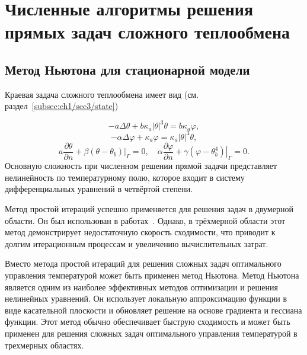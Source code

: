 \section{Численные алгоритмы решения прямых задач сложного теплообмена}
\label{sec:ch4/sec1}

\subsection{Метод Ньютона для стационарной модели}
\label{subsec:ch4/sec1/stationary}
Краевая задача сложного теплообмена
имеет вид (см. раздел~\ref{subsec:ch1/sec3/state})

\begin{equation}
    \label{eq:4_1:1}
        -a \Delta \theta+b \kappa_{a}| \theta|^{3} \theta =
        b \kappa_{a} \varphi,
\end{equation}
\begin{equation}
    \label{eq:4_1:2}
        -\alpha \Delta \varphi+\kappa_{a} \varphi =
        \kappa_{a}|\theta|^{3} \theta,
\end{equation}
\begin{equation}
    \label{eq:4_1:3}
        a \frac{\partial \theta}{\partial n}
        +\left.\beta\left(\theta-\theta_{b}\right)\right|_{\Gamma}=0,
        \quad \alpha \frac{\partial \varphi}{\partial n}
        +\left.\gamma\left(\varphi-\theta_{b}^{4}\right)\right|_{\Gamma}=0.
\end{equation}
Основную сложность при численном решении прямой задачи представляет нелинейность
по температурному полю, которое входит в систему
дифференциальных уравнений в четвёртой степени.

Метод простой итераций успешно применяется для решения задач в двумерной области.
Он был использован в работах~\cite{Kovtanyuk2015,astrakhantseva2014numerical}.
Однако, в трёхмерной области этот метод демонстрирует недостаточную скорость сходимости,
что приводит к долгим итерационным процессам и увеличению вычислительных затрат.

Вместо метода простой итераций для решения сложных задач оптимального управления
температурой может быть применен метод Ньютона.
Метод Ньютона является одним из наиболее эффективных методов оптимизации
и решения нелинейных уравнений.
Он использует локальную аппроксимацию функции в виде касательной плоскости
и обновляет решение на основе градиента и гессиана функции.
Этот метод обычно обеспечивает быструю сходимость и может быть
применен для решения сложных задач оптимального
управления температурой в трехмерных областях.


